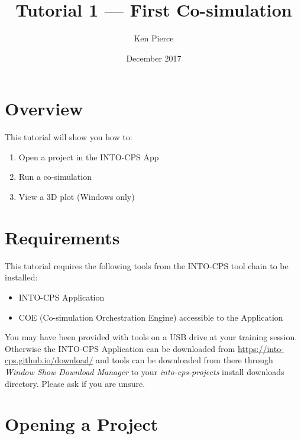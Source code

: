 \documentclass[11pt,a4paper]{../tutorial}
\title{Tutorial 1 --- First Co-simulation}
\date{December 2017}
\author{Ken Pierce}
\begin{document}
\section*{Overview}

This tutorial will show you how to:

\begin{enumerate}[noitemsep]
\item Open a project in the INTO-CPS App
\item Run a co-simulation
\item View a 3D plot (Windows only)
\end{enumerate}

\section*{Requirements}

This tutorial requires the following tools from the INTO-CPS tool chain to be installed:

\begin{itemize}[noitemsep]
\item INTO-CPS Application
\item COE (Co-simulation Orchestration Engine) accessible to the Application
\end{itemize}

You may have been provided with tools on a USB drive at your training session. Otherwise the INTO-CPS Application can be downloaded from \url{https://into-cps.github.io/download/} and tools can be downloaded from there through \emph{Window \menusep Show Download Manager} to your \emph{into-cps-projects} install downloads directory. Please ask if you are unsure.

\section{Opening a Project}
\end{document}
